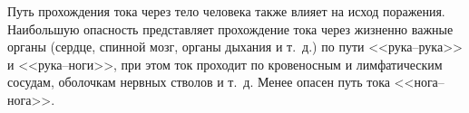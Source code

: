 Путь прохождения тока через тело человека также влияет на исход поражения.
Наибольшую опасность представляет прохождение тока через жизненно важные органы (сердце, спинной мозг, органы дыхания и т.~д.) по пути <<рука--рука>> и <<рука--ноги>>, при этом ток проходит по кровеносным и лимфатическим сосудам, оболочкам нервных стволов и т.~д.
Менее опасен путь тока <<нога--нога>>.
